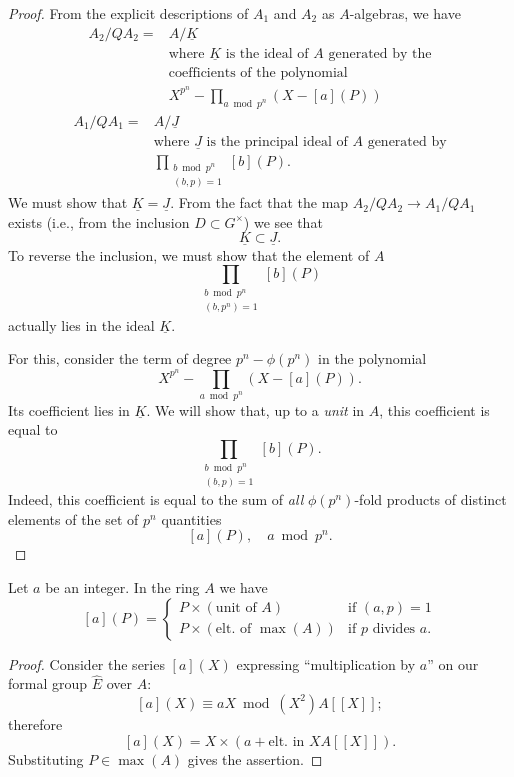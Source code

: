 \begin{proof}
From the explicit descriptions of $A_1$ and $A_2$ as $A$-algebras, we have
\[
\begin{aligned}
A_2/QA_2 = {} & A/\underline{K} \\
& \text{where } \underline{K} \text{ is the ideal of } A \text{ generated by the} \\
& \text{coefficients of the polynomial} \\
& X^{p^n} - \prod_{a \bmod p^n} (X - [a](P))
\end{aligned}
\]
\[
\begin{aligned}
A_1/QA_1 = {} & A/\underline{J} \\
& \text{where } \underline{J} \text{ is the principal ideal of } A \text{ generated by} \\
& \prod_{\substack{b \bmod p^n \\ (b,p)=1}} [b](P).
\end{aligned}
\]
We must show that $\underline{K} = \underline{J}$. From the fact that the map $A_2/QA_2 \to A_1/QA_1$ exists (i.e., from the inclusion $D \subset G^\times$) we see that
\[
\underline{K} \subset \underline{J}.
\]
To reverse the inclusion, we must show that the element of $A$
\[
\prod_{\substack{b \bmod p^n \\ (b,p^n)=1}} [b](P)
\]
actually lies in the ideal $\underline{K}$.

For this, consider the term of degree $p^n - \phi(p^n)$ in the polynomial
\[
X^{p^n} - \prod_{a \bmod p^n} (X - [a](P)).
\]
Its coefficient lies in $\underline{K}$. We will show that, up to a \emph{unit} in $A$, this coefficient is equal to
\[
\prod_{\substack{b \bmod p^n \\ (b,p)=1}} [b](P).
\]
Indeed, this coefficient is equal to the sum of \emph{all} $\phi(p^n)$-fold products of distinct elements of the set of $p^n$ quantities
\[
[a](P), \quad a \bmod p^n.
\]
\end{proof}

\begin{klem}\label{lem:6.3.6}
Let $a$ be an integer. In the ring $A$ we have
\[
[a](P) = \begin{cases} P \times (\text{unit of } A) & \text{if } (a,p) = 1 \\ P \times (\text{elt. of } \max(A)) & \text{if } p \text{ divides } a. \end{cases}
\]
\end{klem}

\begin{proof}
Consider the series $[a](X)$ expressing ``multiplication by $a$'' on our formal group $\hat{E}$ over $A$:
\[
[a](X) \equiv aX \bmod (X^2)A[[X]];
\]
therefore
\[
[a](X) = X \times (a + \text{elt. in } XA[[X]]).
\]
Substituting $P \in \max(A)$ gives the assertion.
\end{proof}

